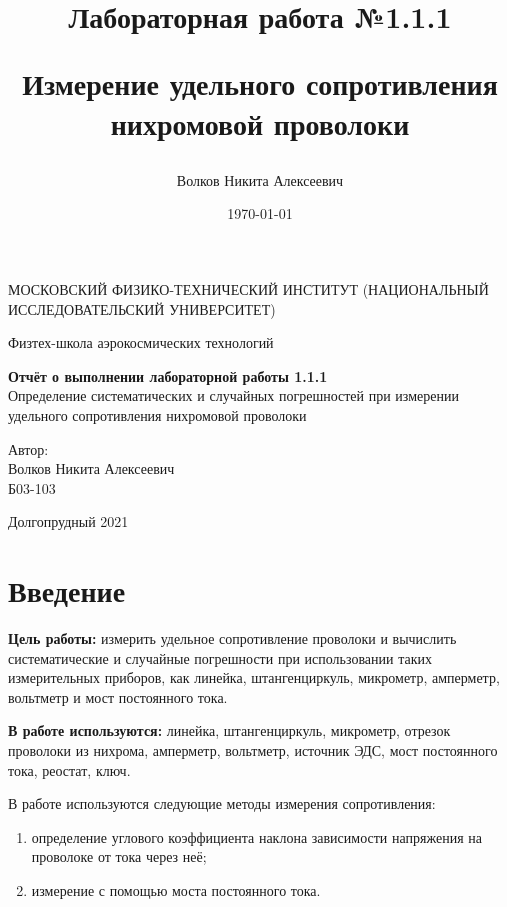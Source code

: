 \documentclass[a4paper,12pt]{article}
\author{Волков Никита Алексеевич}
\title{Лабораторная работа №1.1.1

Измерение удельного сопротивления нихромовой проволоки
}
\date{\today}
\begin{document}
\begin{titlepage}
	\begin{center}
		{\large МОСКОВСКИЙ ФИЗИКО-ТЕХНИЧЕСКИЙ ИНСТИТУТ (НАЦИОНАЛЬНЫЙ ИССЛЕДОВАТЕЛЬСКИЙ УНИВЕРСИТЕТ)}
	\end{center}
	\begin{center}
		{\large Физтех-школа аэрокосмических технологий}
	\end{center}
	
	
	\vspace{4.5cm}
	{\huge
		\begin{center}
			{\bf Отчёт о выполнении лабораторной работы 1.1.1}\\
			Определение систематических и случайных погрешностей при измерении удельного сопротивления нихромовой проволоки
		\end{center}
	}
	\vspace{2cm}
	\begin{flushright}
		{\LARGE Автор:\\ Волков Никита Алексеевич \\
			\vspace{0.2cm}
			Б03-103}
	\end{flushright}
	\vspace{8cm}
	\begin{center}
		Долгопрудный 2021
	\end{center}
\end{titlepage}

\tableofcontents

\newpage

\section{Введение}

\textbf{Цель работы:} измерить удельное сопротивление проволоки и вычислить систематические и случайные погрешности при использовании таких измерительных приборов, как линейка, штангенциркуль, микрометр, амперметр, вольтметр и мост постоянного тока.
\medskip

\textbf{В работе используются:} линейка, штангенциркуль, микрометр, отрезок проволоки из нихрома, амперметр, вольтметр, источник ЭДС, мост постоянного тока, реостат, ключ.
\medskip

В работе используются следующие методы измерения сопротивления:
\begin{enumerate}
	\item определение углового коэффициента наклона зависимости напряжения на проволоке от тока через неё;
	\item измерение с помощью моста постоянного тока.
\end{enumerate}
\end{document}
